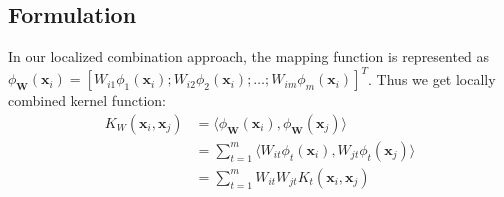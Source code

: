 \documentclass[10pt,journal,compsoc]{IEEEtran}
\begin{document}
\subsection{Formulation}
In our localized combination approach, the mapping function is represented as $\phi_{\mathbf{W}}(\mathbf{x}_i) = [ W_{i1} \phi_{1}(\mathbf{x}_i); W_{i2} \phi_{2}(\mathbf{x}_i); \ldots; W_{im} \phi_{m}(\mathbf{x}_i) ]^T$. Thus we get locally combined kernel function:
\begin{align}\label{kernel_func}
K_W(\mathbf{x}_i, \mathbf{x}_j) &= \langle \phi_{\mathbf{W}}(\mathbf{x}_i), \phi_{\mathbf{W}}(\mathbf{x}_j)  \rangle \\
&= \sum_{t=1}^{m} \langle W_{it} \phi_{t}(\mathbf{x}_i), W_{jt} \phi_{t}(\mathbf{x}_j) \rangle \nonumber\\
&= \sum_{t=1}^{m} W_{it} W_{jt} K_t(\mathbf{x}_i, \mathbf{x}_j)  \nonumber
\end{align}
\end{document}
